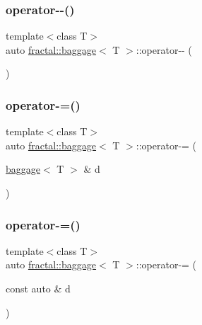 \mbox{\label{classfractal_1_1baggage_a10b87d02b3423000f27c7f0970adffb8}} 
\subsubsection{\texorpdfstring{operator-\/-\/()}{operator--()}}
{\footnotesize\ttfamily template$<$class T$>$ \\
auto \hyperlink{classfractal_1_1baggage}{fractal\+::baggage}$<$ T $>$\+::operator-\/-\/ (\begin{DoxyParamCaption}{ }\end{DoxyParamCaption})\hspace{0.3cm}{\ttfamily [inline]}}

\mbox{\label{classfractal_1_1baggage_a69180e126eca3a52976bf92dcf5fb998}} 
\subsubsection{\texorpdfstring{operator-\/=()}{operator-=()}\hspace{0.1cm}{\footnotesize\ttfamily [1/3]}}
{\footnotesize\ttfamily template$<$class T$>$ \\
auto \hyperlink{classfractal_1_1baggage}{fractal\+::baggage}$<$ T $>$\+::operator-\/= (\begin{DoxyParamCaption}\item[{\hyperlink{classfractal_1_1baggage}{baggage}$<$ T $>$ \&}]{d }\end{DoxyParamCaption})\hspace{0.3cm}{\ttfamily [inline]}}

\mbox{\label{classfractal_1_1baggage_aee89d99faea56059eb636574ebe20022}} 
\subsubsection{\texorpdfstring{operator-\/=()}{operator-=()}\hspace{0.1cm}{\footnotesize\ttfamily [2/3]}}
{\footnotesize\ttfamily template$<$class T$>$ \\
auto \hyperlink{classfractal_1_1baggage}{fractal\+::baggage}$<$ T $>$\+::operator-\/= (\begin{DoxyParamCaption}\item[{const auto \&}]{d }\end{DoxyParamCaption})\hspace{0.3cm}{\ttfamily [inline]}}


